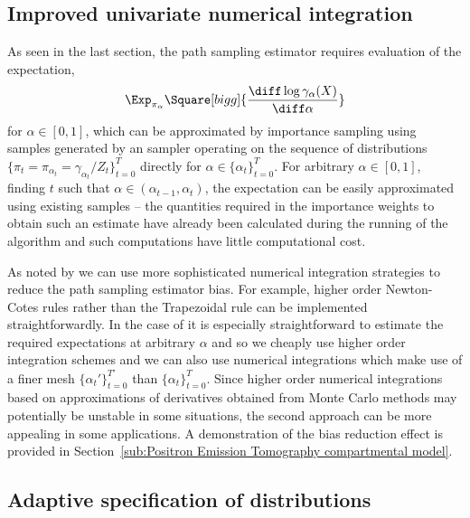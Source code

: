 \subsection{Improved univariate numerical integration}
\label{sub:Improved univariate numerical integration}

As seen in the last section, the path sampling estimator requires evaluation
of the expectation,
\begin{equation*}
  \Exp_{\pi_\alpha}\Square[bigg]{
    \frac{\diff\log\gamma_{\alpha}(X)}{\diff\alpha}}
\end{equation*}
for $\alpha\in[0,1]$, which can be approximated by importance sampling using
samples generated by an \smc sampler operating on the sequence of
distributions $\{\pi_t = \pi_{\alpha_t} = \gamma_{\alpha_t}/Z_t\}_{t=0}^T$
directly for $\alpha\in\{\alpha_t\}_{t=0}^T$. For arbitrary $\alpha\in[0,1]$,
finding $t$ such that $\alpha\in(\alpha_{t-1},\alpha_t)$, the expectation can
be easily approximated using existing \smc samples -- the quantities required
in the importance weights to obtain such an estimate have already been
calculated during the running of the \smc algorithm and such computations have
little computational cost.

As noted by \cite{Friel:2012}  we can use more sophisticated numerical
integration strategies to reduce the path sampling estimator bias. For
example, higher order Newton-Cotes rules rather than the Trapezoidal rule can
be implemented straightforwardly. In the case of \smc it is especially
straightforward to estimate the required expectations at arbitrary $\alpha$
and so we cheaply use higher order integration schemes and we can also use
numerical integrations which make use of a finer mesh
$\{\alpha_t'\}_{t=0}^{T'}$ than $\{\alpha_t\}_{t=0}^T$. Since higher order
numerical integrations based on approximations of derivatives obtained from
Monte Carlo methods may potentially be unstable in some situations, the second
approach can be more appealing in some applications. A demonstration of the
bias reduction effect is provided in Section~\ref{sub:Positron Emission
  Tomography compartmental model}.

\subsection{Adaptive specification of distributions}
\label{sub:Adaptive specification of distributions}

